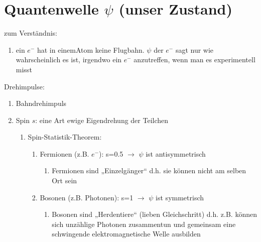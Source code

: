 \section{Quantenwelle $\psi$ (unser Zustand)}

zum Verständnis:
\begin{enumerate}
    \item ein $e^-$ hat in einemAtom keine Flugbahn. $\psi$ der $e^-$ sagt nur wie wahrscheinlich es ist,
    irgendwo ein $e^-$  anzutreffen, wenn man es experimentell misst
\end{enumerate}

Drehimpulse:
\begin{enumerate}
    \item Bahndrehimpuls
    \item Spin $s$: eine Art ewige Eigendrehung der Teilchen
\begin{enumerate}
    \item Spin-Statistik-Theorem:
\begin{enumerate}
    \item Fermionen (z.B. $e^-$): s=0.5  $\rightarrow$ $\psi$ ist antisymmetrisch
    \begin{enumerate}
        \item Fermionen sind „Einzelgänger“ d.h. sie können nicht am selben Ort sein
    \end{enumerate}
    \item Bosonen (z.B. Photonen): s=1 $\rightarrow$ $\psi$ ist symmetrisch 
    \begin{enumerate}
        \item Bosonen sind „Herdentiere“ (lieben Gleichschritt) d.h. z.B.  können sich unzählige
        Photonen zusammentun und gemeinsam eine schwingende elektromagnetische Welle ausbilden 
    \end{enumerate}
\end{enumerate}
\end{enumerate}
\end{enumerate}
